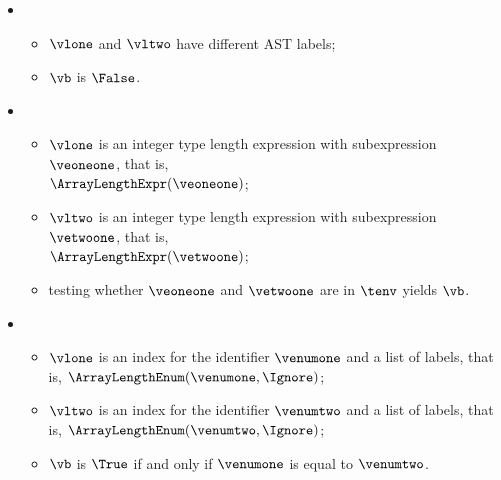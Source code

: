 \ProseParagraph
\OneApplies
\begin{itemize}
  \item {}
  \begin{itemize}
    \item $\vlone$ and $\vltwo$ have different AST labels;
    \item $\vb$ is $\False$.
  \end{itemize}

  \item {}
  \begin{itemize}
    \item $\vlone$ is an integer type length expression with subexpression $\veoneone$, that is, \\ $\ArrayLengthExpr(\veoneone)$;
    \item $\vltwo$ is an integer type length expression with subexpression $\vetwoone$, that is, \\ $\ArrayLengthExpr(\vetwoone)$;
    \item testing whether $\veoneone$ and $\vetwoone$ are \equivalentexprsterm{} in $\tenv$ yields $\vb$\ProseOrTypeError.
  \end{itemize}

  \item {}
  \begin{itemize}
    \item $\vlone$ is an \enumerationtypeterm{} index for the identifier $\venumone$ and a list of labels, that is,
          $\ArrayLengthEnum(\venumone, \Ignore)$;
    \item $\vltwo$ is an \enumerationtypeterm{} index for the identifier $\venumtwo$ and a list of labels, that is,
           $\ArrayLengthEnum(\venumtwo, \Ignore)$;
    \item $\vb$ is $\True$ if and only if $\venumone$ is equal to $\venumtwo$.
  \end{itemize}
\end{itemize}

\FormallyParagraph
\begin{mathpar}
\end{mathpar}

\begin{mathpar}
\end{mathpar}

